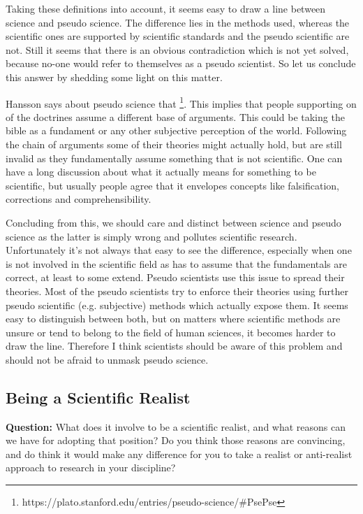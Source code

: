 \documentclass[11pt]{scrartcl}
\begin{document}
Taking these definitions into account, it seems easy to draw a line between science and pseudo science. The difference lies in the methods used, whereas the scientific ones are supported by scientific standards and the pseudo scientific are not. Still it seems that there is an obvious contradiction which is not yet solved, because no-one would refer to themselves as a pseudo scientist. So let us conclude this answer by shedding some light on this matter.

Hansson says about pseudo science that  \footnote{https://plato.stanford.edu/entries/pseudo-science/\#PsePse}. This implies that people supporting on of the doctrines assume a different base of arguments. This could be taking the bible as a fundament or any other subjective perception of the world. Following the chain of arguments some of their theories might actually hold, but are still invalid as they fundamentally assume something that is not scientific. One can have a long discussion about what it actually means for something to be scientific, but usually people agree that it envelopes concepts like falsification, corrections and comprehensibility.

Concluding from this, we should care and distinct between science and pseudo science as the latter is simply wrong and pollutes scientific research. Unfortunately it's not always that easy to see the difference, especially when one is not involved in the scientific field as has to assume that the fundamentals are correct, at least to some extend. Pseudo scientists use this issue to spread their theories. Most of the pseudo scientists try to enforce their theories using further pseudo scientific (e.g. subjective) methods which actually expose them. It seems easy to distinguish between both, but on matters where scientific methods are unsure or tend to belong to the field of human sciences, it becomes harder to draw the line. Therefore I think scientists should be aware of this problem and should not be afraid to unmask pseudo science.



\subsection{Being a Scientific Realist}

\textbf{Question:} What does it involve to be a scientific realist, and what reasons can we have for adopting that position? Do you think those reasons are convincing, and do think it would make any difference for you to take a realist or anti-realist approach to research in your discipline?
\end{document}

